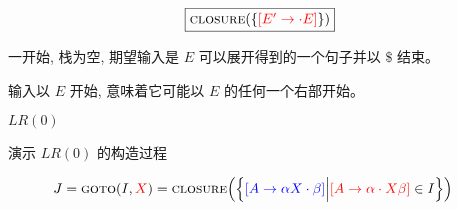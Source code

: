 \begin{frame}{}
  \[
    \fbox{$\textsc{closure}(\{\textcolor{red}{[E' \to \cdot E]}\})$}
  \]

  \vspace{0.50cm}
  \begin{center}
    一开始, 栈为空, 期望输入是 $E$ 可以展开得到的一个句子并以 $\$$ 结束。

    \vspace{1.0cm}
    输入以 $E$ 开始, 意味着它可能以 $E$ 的任何一个右部开始。
  \end{center}
\end{frame}

\begin{frame}{}
  \begin{center}
    $LR(0)$ 

    \vspace{0.30cm}

    \vspace{0.30cm}
  \end{center}
\end{frame}

\begin{frame}{}
  \begin{center}
    演示 $LR(0)$ 的构造过程
  \end{center}

  \pause
  \vspace{-0.80cm}
  \begin{center}
    \begin{align*}
      J = \textsc{goto}(I, \textcolor{red}{X}) &= \textsc{closure}\Big(\Big\{
            \textcolor{blue}{[A \to \alpha X \cdot \beta]}
          \Big\lvert \textcolor{red}{[A \to \alpha \cdot X \beta]} \in I \Big\}\Big)
    \end{align*}
  \end{center}
\end{frame}



